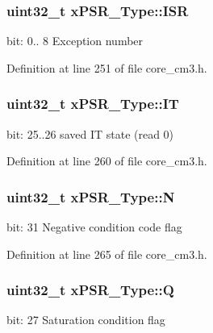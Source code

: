 \subsubsection[{\texorpdfstring{I\+SR}{ISR}}]{\setlength{\rightskip}{0pt plus 5cm}uint32\+\_\+t x\+P\+S\+R\+\_\+\+Type\+::\+I\+SR}\hypertarget{unionxPSR__Type_a3e9120dcf1a829fc8d2302b4d0673970}{}\label{unionxPSR__Type_a3e9120dcf1a829fc8d2302b4d0673970}
bit\+: 0.. 8 Exception number 

Definition at line 251 of file core\+\_\+cm3.\+h.

\subsubsection[{\texorpdfstring{IT}{IT}}]{\setlength{\rightskip}{0pt plus 5cm}uint32\+\_\+t x\+P\+S\+R\+\_\+\+Type\+::\+IT}\hypertarget{unionxPSR__Type_a3200966922a194d84425e2807a7f1328}{}\label{unionxPSR__Type_a3200966922a194d84425e2807a7f1328}
bit\+: 25..26 saved IT state (read 0) 

Definition at line 260 of file core\+\_\+cm3.\+h.

\subsubsection[{\texorpdfstring{N}{N}}]{\setlength{\rightskip}{0pt plus 5cm}uint32\+\_\+t x\+P\+S\+R\+\_\+\+Type\+::N}\hypertarget{unionxPSR__Type_a2db9a52f6d42809627d1a7a607c5dbc5}{}\label{unionxPSR__Type_a2db9a52f6d42809627d1a7a607c5dbc5}
bit\+: 31 Negative condition code flag 

Definition at line 265 of file core\+\_\+cm3.\+h.

\subsubsection[{\texorpdfstring{Q}{Q}}]{\setlength{\rightskip}{0pt plus 5cm}uint32\+\_\+t x\+P\+S\+R\+\_\+\+Type\+::Q}\hypertarget{unionxPSR__Type_add7cbd2b0abd8954d62cd7831796ac7c}{}\label{unionxPSR__Type_add7cbd2b0abd8954d62cd7831796ac7c}
bit\+: 27 Saturation condition flag 

